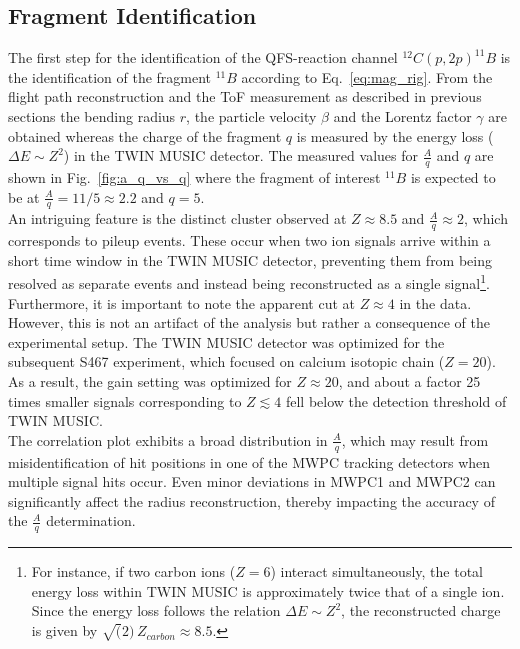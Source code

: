 \subsection{Fragment Identification}\label{sec:frag_ident}
The first step for the identification of the QFS-reaction channel $^{12}C(p,2p)^{11}B$ is the identification of the fragment $^{11}B$ according to Eq.~\ref{eq:mag_rig}. From the flight path reconstruction and the ToF measurement as described in previous sections the bending radius $r$, the particle velocity $\beta$ and the Lorentz factor $\gamma$ are obtained whereas the charge of the fragment $q$ is measured by the energy loss ($\Delta E \sim Z^2$) in the TWIN MUSIC detector.\newline
The measured values for $\frac{A}{q}$ and $q$ are shown in Fig.~\ref{fig:a_q_vs_q} where the fragment of interest $^{11}B$ is expected to be at $\frac{A}{q} = 11/5 \approx 2.2$ and $q = 5$.\\
An intriguing feature is the distinct cluster observed at $Z \approx 8.5$ and $\frac{A}{q} \approx 2$, which corresponds to pileup events. These occur when two ion signals arrive within a short time window in the TWIN MUSIC detector, preventing them from being resolved as separate events and instead being reconstructed as a single signal\footnote{For instance, if two carbon ions ($Z = 6$) interact simultaneously, the total energy loss within TWIN MUSIC is approximately twice that of a single ion. Since the energy loss follows the relation $\Delta E \sim Z^2$, the reconstructed charge is given by $\sqrt(2)\,Z_{carbon} \approx 8.5 $.}.
%
Furthermore, it is important to note the apparent cut at $Z \approx 4$ in the data. However, this is not an artifact of the analysis but rather a consequence of the experimental setup. The TWIN MUSIC detector was optimized for the subsequent S467 experiment, which focused on calcium isotopic chain ($Z = 20$). As a result, the gain setting was optimized for $Z \approx 20$, and about a factor 25 times smaller signals corresponding to $Z \lesssim 4$ fell below the detection threshold of TWIN MUSIC. \\
The correlation plot exhibits a broad distribution in $\frac{A}{q}$, which may result from misidentification of hit positions in one of the MWPC tracking detectors when multiple signal hits occur. Even minor deviations in MWPC1 and MWPC2 can significantly affect the radius reconstruction, thereby impacting the accuracy of the $\frac{A}{q}$ determination.\newline


